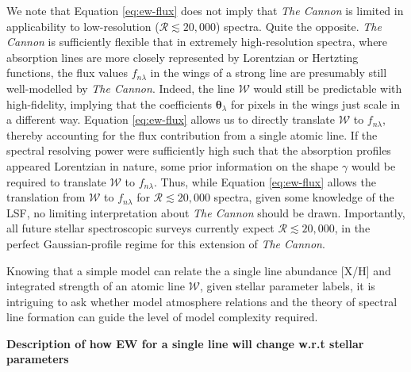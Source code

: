 \documentclass[useAMS,usenatbib]{mn2e}
\newcommand\tc{\textit{The Cannon}}
\newcommand\cv{{\boldsymbol\theta}_\lambda}
\begin{document}
We note that Equation \ref{eq:ew-flux} does not imply that \tc{} is limited in applicability to low-resolution ($\mathcal{R} \lesssim 20,000$) spectra. Quite the opposite. \tc{} is sufficiently flexible that in extremely high-resolution spectra, where absorption lines are more closely represented by Lorentzian or Hertzting functions, the flux values $f_{n\lambda}$ in the wings of a strong line are presumably still well-modelled by \tc{}. Indeed, the line $\mathcal{W}$ would still be predictable with high-fidelity, implying that the coefficients $\cv$ for pixels in the wings just scale in a different way. Equation \ref{eq:ew-flux} allows us to directly translate $\mathcal{W}$ to $f_{n\lambda}$, thereby accounting for the flux contribution from a single atomic line. If the spectral resolving power were sufficiently high such that the absorption profiles appeared Lorentzian in nature, some prior information on the shape $\gamma$ would be required to translate $\mathcal{W}$ to $f_{n\lambda}$. Thus, while Equation \ref{eq:ew-flux} allows the translation from $\mathcal{W}$ to $f_{n\lambda}$ for $\mathcal{R} \lesssim 20,000$ spectra, given some knowledge of the LSF, no limiting interpretation about \tc{} should be drawn. Importantly, all future stellar spectroscopic surveys  currently expect $\mathcal{R} \lesssim 20,000$, in the perfect Gaussian-profile regime for this extension of \tc{}.


Knowing that a simple model can relate the a single line abundance [X/H] and integrated strength of an atomic line $\mathcal{W}$, given stellar parameter labels, it is intriguing to ask whether model atmosphere relations and the theory of spectral line formation can guide the level of model complexity required.

\textbf{Description of how EW for a single line will change w.r.t stellar parameters}
\end{document}

